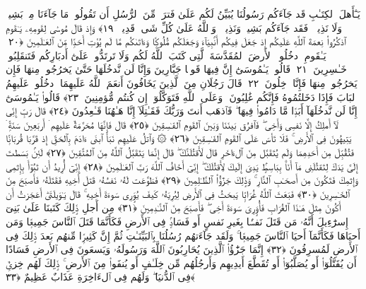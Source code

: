  يَـٰٓأَهلَ ٱلكِتَـٰبِ قَد جَآءَكُم رَسُولُنَا يُبَيِّنُ لَكُم عَلَىٰ فَترَةٍۢ مِّنَ ٱلرُّسُلِ أَن تَقُولُوا۟ مَا جَآءَنَا مِنۢ بَشِيرٍۢ وَلَا نَذِيرٍۢ ۖ فَقَد جَآءَكُم بَشِيرٌۭ وَنَذِيرٌۭ ۗ وَٱللَّهُ عَلَىٰ كُلِّ شَىءٍۢ قَدِيرٌۭ ﴿١٩﴾
 وَإِذ قَالَ مُوسَىٰ لِقَومِهِۦ يَـٰقَومِ ٱذكُرُوا۟ نِعمَةَ ٱللَّهِ عَلَيكُم إِذ جَعَلَ فِيكُم أَنۢبِيَآءَ وَجَعَلَكُم مُّلُوكًۭا وَءَاتَىٰكُم مَّا لَم يُؤتِ أَحَدًۭا مِّنَ ٱلعَـٰلَمِينَ ﴿٢٠﴾
 يَـٰقَومِ ٱدخُلُوا۟ ٱلأَرضَ ٱلمُقَدَّسَةَ ٱلَّتِى كَتَبَ ٱللَّهُ لَكُم وَلَا تَرتَدُّوا۟ عَلَىٰٓ أَدبَارِكُم فَتَنقَلِبُوا۟ خَـٰسِرِينَ ﴿٢١﴾
 قَالُوا۟ يَـٰمُوسَىٰٓ إِنَّ فِيهَا قَومًۭا جَبَّارِينَ وَإِنَّا لَن نَّدخُلَهَا حَتَّىٰ يَخرُجُوا۟ مِنهَا فَإِن يَخرُجُوا۟ مِنهَا فَإِنَّا دَٟخِلُونَ ﴿٢٢﴾
 قَالَ رَجُلَانِ مِنَ ٱلَّذِينَ يَخَافُونَ أَنعَمَ ٱللَّهُ عَلَيهِمَا ٱدخُلُوا۟ عَلَيهِمُ ٱلبَابَ فَإِذَا دَخَلتُمُوهُ فَإِنَّكُم غَٰلِبُونَ ۚ وَعَلَى ٱللَّهِ فَتَوَكَّلُوٓا۟ إِن كُنتُم مُّؤمِنِينَ ﴿٢٣﴾
 قَالُوا۟ يَـٰمُوسَىٰٓ إِنَّا لَن نَّدخُلَهَآ أَبَدًۭا مَّا دَامُوا۟ فِيهَا ۖ فَٱذهَب أَنتَ وَرَبُّكَ فَقَـٰتِلَآ إِنَّا هَـٰهُنَا قَـٰعِدُونَ ﴿٢٤﴾
 قَالَ رَبِّ إِنِّى لَآ أَملِكُ إِلَّا نَفسِى وَأَخِى ۖ فَٱفرُق بَينَنَا وَبَينَ ٱلقَومِ ٱلفَـٰسِقِينَ ﴿٢٥﴾
 قَالَ فَإِنَّهَا مُحَرَّمَةٌ عَلَيهِم ۛ أَربَعِينَ سَنَةًۭ ۛ يَتِيهُونَ فِى ٱلأَرضِ ۚ فَلَا تَأسَ عَلَى ٱلقَومِ ٱلفَـٰسِقِينَ ﴿٢٦﴾
 ۞ وَٱتلُ عَلَيهِم نَبَأَ ٱبنَى ءَادَمَ بِٱلحَقِّ إِذ قَرَّبَا قُربَانًۭا فَتُقُبِّلَ مِن أَحَدِهِمَا وَلَم يُتَقَبَّل مِنَ ٱلءَاخَرِ قَالَ لَأَقتُلَنَّكَ ۖ قَالَ إِنَّمَا يَتَقَبَّلُ ٱللَّهُ مِنَ ٱلمُتَّقِينَ ﴿٢٧﴾
 لَئِنۢ بَسَطتَ إِلَىَّ يَدَكَ لِتَقتُلَنِى مَآ أَنَا۠ بِبَاسِطٍۢ يَدِىَ إِلَيكَ لِأَقتُلَكَ ۖ إِنِّىٓ أَخَافُ ٱللَّهَ رَبَّ ٱلعَـٰلَمِينَ ﴿٢٨﴾
 إِنِّىٓ أُرِيدُ أَن تَبُوٓأَ بِإِثمِى وَإِثمِكَ فَتَكُونَ مِن أَصحَـٰبِ ٱلنَّارِ ۚ وَذَٟلِكَ جَزَٰٓؤُا۟ ٱلظَّـٰلِمِينَ ﴿٢٩﴾
 فَطَوَّعَت لَهُۥ نَفسُهُۥ قَتلَ أَخِيهِ فَقَتَلَهُۥ فَأَصبَحَ مِنَ ٱلخَـٰسِرِينَ ﴿٣٠﴾
 فَبَعَثَ ٱللَّهُ غُرَابًۭا يَبحَثُ فِى ٱلأَرضِ لِيُرِيَهُۥ كَيفَ يُوَٟرِى سَوءَةَ أَخِيهِ ۚ قَالَ يَـٰوَيلَتَىٰٓ أَعَجَزتُ أَن أَكُونَ مِثلَ هَـٰذَا ٱلغُرَابِ فَأُوَٟرِىَ سَوءَةَ أَخِى ۖ فَأَصبَحَ مِنَ ٱلنَّـٰدِمِينَ ﴿٣١﴾
 مِن أَجلِ ذَٟلِكَ كَتَبنَا عَلَىٰ بَنِىٓ إِسرَٰٓءِيلَ أَنَّهُۥ مَن قَتَلَ نَفسًۢا بِغَيرِ نَفسٍ أَو فَسَادٍۢ فِى ٱلأَرضِ فَكَأَنَّمَا قَتَلَ ٱلنَّاسَ جَمِيعًۭا وَمَن أَحيَاهَا فَكَأَنَّمَآ أَحيَا ٱلنَّاسَ جَمِيعًۭا ۚ وَلَقَد جَآءَتهُم رُسُلُنَا بِٱلبَيِّنَـٰتِ ثُمَّ إِنَّ كَثِيرًۭا مِّنهُم بَعدَ ذَٟلِكَ فِى ٱلأَرضِ لَمُسرِفُونَ ﴿٣٢﴾
 إِنَّمَا جَزَٰٓؤُا۟ ٱلَّذِينَ يُحَارِبُونَ ٱللَّهَ وَرَسُولَهُۥ وَيَسعَونَ فِى ٱلأَرضِ فَسَادًا أَن يُقَتَّلُوٓا۟ أَو يُصَلَّبُوٓا۟ أَو تُقَطَّعَ أَيدِيهِم وَأَرجُلُهُم مِّن خِلَـٰفٍ أَو يُنفَوا۟ مِنَ ٱلأَرضِ ۚ ذَٟلِكَ لَهُم خِزىٌۭ فِى ٱلدُّنيَا ۖ وَلَهُم فِى ٱلءَاخِرَةِ عَذَابٌ عَظِيمٌ ﴿٣٣﴾
